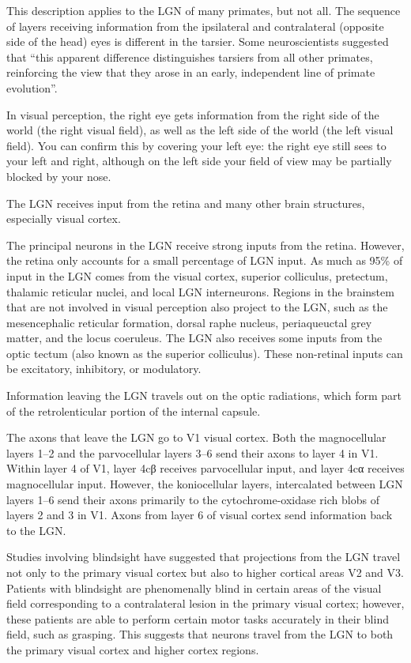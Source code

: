 This description applies to the LGN of many primates, but not all. The sequence of layers receiving information from the ipsilateral and contralateral (opposite side of the head) eyes is different in the tarsier. Some neuroscientists suggested that ``this apparent difference distinguishes tarsiers from all other primates, reinforcing the view that they arose in an early, independent line of primate evolution''.

In visual perception, the right eye gets information from the right side of the world (the right visual field), as well as the left side of the world (the left visual field). You can confirm this by covering your left eye: the right eye still sees to your left and right, although on the left side your field of view may be partially blocked by your nose.

The LGN receives input from the retina and many other brain structures, especially visual cortex.

The principal neurons in the LGN receive strong inputs from the retina. However, the retina only accounts for a small percentage of LGN input. As much as 95\% of input in the LGN comes from the visual cortex, superior colliculus, pretectum, thalamic reticular nuclei, and local LGN interneurons. Regions in the brainstem that are not involved in visual perception also project to the LGN, such as the mesencephalic reticular formation, dorsal raphe nucleus, periaqueuctal grey matter, and the locus coeruleus. The LGN also receives some inputs from the optic tectum (also known as the superior colliculus). These non-retinal inputs can be excitatory, inhibitory, or modulatory.

Information leaving the LGN travels out on the optic radiations, which form part of the retrolenticular portion of the internal capsule.

The axons that leave the LGN go to V1 visual cortex. Both the magnocellular layers 1--2 and the parvocellular layers 3--6 send their axons to layer 4 in V1. Within layer 4 of V1, layer 4cβ receives parvocellular input, and layer 4cα receives magnocellular input. However, the koniocellular layers, intercalated between LGN layers 1--6 send their axons primarily to the cytochrome-oxidase rich blobs of layers 2 and 3 in V1. Axons from layer 6 of visual cortex send information back to the LGN.

Studies involving blindsight have suggested that projections from the LGN travel not only to the primary visual cortex but also to higher cortical areas V2 and V3. Patients with blindsight are phenomenally blind in certain areas of the visual field corresponding to a contralateral lesion in the primary visual cortex; however, these patients are able to perform certain motor tasks accurately in their blind field, such as grasping. This suggests that neurons travel from the LGN to both the primary visual cortex and higher cortex regions.

